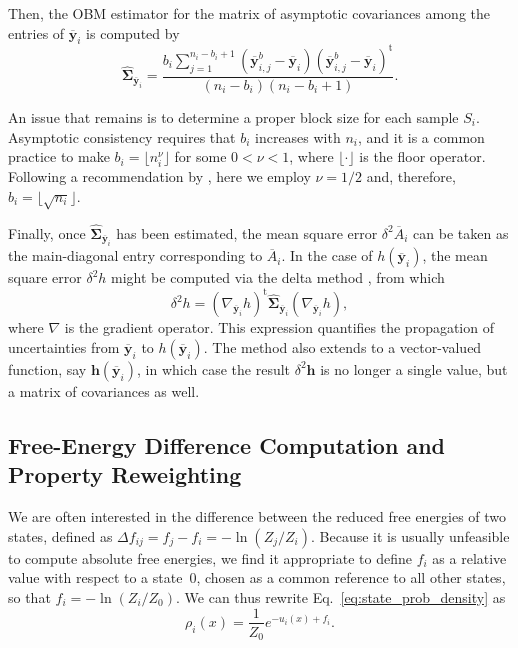 \documentclass[journal=jctcce,manuscript=article,layout=twocolumn]{achemso}
\newcommand{\mt}[1]{\boldsymbol{\mathbf{#1}}}   %
\newcommand{\vt}[1]{\boldsymbol{\mathbf{#1}}}   %
\newcommand{\tr}[1]{#1^\text{t}}                %
\newcommand{\avg}[1]{\overline{#1}}             %
\begin{document}
Then, the OBM estimator for the matrix of asymptotic covariances among the entries of $\avg{\vt y}_i$ is computed by \cite{Meketon_1984}
\begin{equation}
\label{eq:obm asymptotic covariance}
\hat{\mt \Sigma}_{\avg{\vt y}_i} = \frac{b_i \sum\limits_{j=1}^{n_i - b_i + 1} ({\avg{\vt y}}^b_{i,j} - \avg{\vt y}_i) \tr{({\avg{\vt y}}^b_{i,j} - \avg{\vt y}_i)}}{(n_i - b_i)(n_i - b_i + 1)}.
\end{equation}

An issue that remains is to determine a proper block size for each sample $S_i$. Asymptotic consistency requires that $b_i$ increases with $n_i$, and it is a common practice to make $b_i = \lfloor n_i^\nu \rfloor$ for some $0 < \nu < 1$, where $\lfloor \cdot \rfloor$ is the floor operator. Following a recommendation by \citeauthor{Flegal_2010} \cite{Flegal_2010}, here we employ $\nu = 1/2$ and, therefore, $b_i = \lfloor \sqrt{n_i} \rfloor$.

Finally, once $\hat{\mt \Sigma}_{\avg{\vt y}_i}$ has been estimated, the mean square error $\delta^2 \avg A_i$ can be taken as the main-diagonal entry corresponding to $\avg A_i$. In the case of $h(\avg{\vt y}_i)$, the mean square error $\delta^2 h$ might be computed via the delta method \cite{Greene_2012}, from which
\begin{equation}
\label{eq:delta method}
\delta^2 h = \tr{(\nabla_{\avg{\vt y}_i} h)} \hat{\mt \Sigma}_{\avg{\vt y}_i}(\nabla_{\avg{\vt y}_i} h),
\end{equation} 
where $\nabla$ is the gradient operator. This expression quantifies the propagation of uncertainties from $\avg{\vt y}_i$ to $h(\avg{\vt y}_i)$. The method also extends to a vector-valued function, say $\vt h(\avg{\vt y}_i)$, in which case the result $\delta^2 \vt h$ is no longer a single value, but a matrix of covariances as well.

\subsection{Free-Energy Difference Computation and Property Reweighting}
\label{sec:fep and reweighting}

We are often interested in the difference between the reduced free energies of two states, defined as $\Delta f_{ij} = f_j - f_i = - \ln (Z_j/Z_i)$. Because it is usually unfeasible to compute absolute free energies, we find it appropriate to define $f_i$ as a relative value with respect to a state~$0$, chosen as a common reference to all other states, so that $f_i = -\ln (Z_i/Z_0)$. We can thus rewrite Eq.~\eqref{eq:state_prob_density} as
\begin{equation}
\label{eq:state_prob_density_Z0}
\rho_i(x) = \frac{1}{Z_0} e^{-u_i(x)+ f_i}.
\end{equation}
\end{document}
